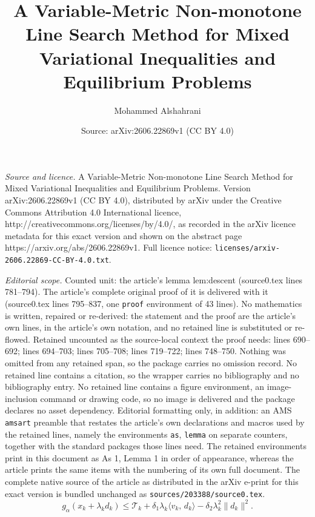 \documentclass[10pt,a4paper]{amsart}
\title{\large A Variable-Metric Non-monotone Line Search Method for Mixed Variational Inequalities and Equilibrium Problems}
\author{Mohammed Alshahrani}
\date{Source: arXiv:2606.22869v1 (CC BY 4.0)}
\newcommand{\inner}[2]{\langle #1,\, #2\rangle}
\newcommand{\norm}[1]{\lVert #1 \rVert}
\begin{document}
\maketitle

\noindent\emph{Source and licence.} \large A Variable-Metric Non-monotone Line Search Method for Mixed Variational Inequalities and Equilibrium Problems. Version arXiv:2606.22869v1 (CC BY 4.0), distributed by arXiv under the Creative Commons Attribution 4.0 International licence, http://creativecommons.org/licenses/by/4.0/, as recorded in the arXiv licence metadata for this exact version and shown on the abstract page https://arxiv.org/abs/2606.22869v1. Full licence notice: \texttt{licenses/arxiv-2606.22869-CC-BY-4.0.txt}.\par\smallskip

\noindent\textit{Editorial scope.} Counted unit: the article's lemma lem:descent (source0.tex lines 781--794). The article's complete original proof of it is delivered with it (source0.tex lines 795--837, one \texttt{proof} environment of 43 lines). No mathematics is written, repaired or re-derived: the statement and the proof are the article's own lines, in the article's own notation, and no retained line is substituted or re-flowed.  Retained uncounted as the source-local context the proof needs: lines 690--692; lines 694--703; lines 705--708; lines 719--722; lines 748--750.  Nothing was omitted from any retained span, so the package carries no omission record.  No retained line contains a citation, so the wrapper carries no bibliography and no bibliography entry.  No retained line contains a figure environment, an image-inclusion command or drawing code, so no image is delivered and the package declares no asset dependency.  Editorial formatting only, in addition: an AMS \texttt{amsart} preamble that restates the article's own declarations and macros used by the retained lines, namely the environments \texttt{as}, \texttt{lemma} on separate counters, together with the standard packages those lines need.  The retained environments print in this document as As 1, Lemma 1 in order of appearance, whereas the article prints the same items with the numbering of its own full document.  The complete native source of the article as distributed in the arXiv e-print for this exact version is bundled unchanged as \texttt{sources/203388/source0.tex}.
\begin{equation}\label{eq:sgm-ls-gap}
  g_\alpha(x_k+\lambda_k d_k)\le \mathcal T_k+\delta_1\lambda_k\inner{v_k}{d_k}-\delta_2\lambda_k^2\norm{d_k}^2 .
\end{equation}
\end{document}
